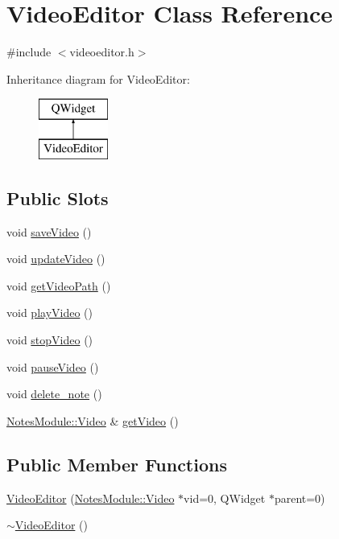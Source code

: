 \hypertarget{class_video_editor}{\section{Video\-Editor Class Reference}
\label{class_video_editor}
}


{\ttfamily \#include $<$videoeditor.\-h$>$}

Inheritance diagram for Video\-Editor\-:\begin{figure}[H]
\begin{center}
\leavevmode
\includegraphics[height=2.000000cm]{class_video_editor}
\end{center}
\end{figure}
\subsection*{Public Slots}
\begin{DoxyCompactItemize}
\item 
void \hyperlink{class_video_editor_a9a109c9d42fc49628809d0e6879860b0}{save\-Video} ()
\item 
void \hyperlink{class_video_editor_a8555ce1e04a385c8d89680695de78e1a}{update\-Video} ()
\item 
void \hyperlink{class_video_editor_ad6c8dfba4def22ea567faeb30cabdec2}{get\-Video\-Path} ()
\item 
void \hyperlink{class_video_editor_af0a827387ec00737cf38c54d8acd8694}{play\-Video} ()
\item 
void \hyperlink{class_video_editor_ac5bbe6c779bc211b4d014878811dba9c}{stop\-Video} ()
\item 
void \hyperlink{class_video_editor_ae612849c0a515b55564f818033cbd5d0}{pause\-Video} ()
\item 
void \hyperlink{class_video_editor_a0401d7f08a50c6c3abbd869afb7f9c5c}{delete\-\_\-note} ()
\item 
\hyperlink{class_notes_module_1_1_video}{Notes\-Module\-::\-Video} \& \hyperlink{class_video_editor_ac4131af5cd3a5aa7696a5916d6eec89f}{get\-Video} ()
\end{DoxyCompactItemize}
\subsection*{Public Member Functions}
\begin{DoxyCompactItemize}
\item 
\hyperlink{class_video_editor_afaba2151dd7813a5081a65afbf326f91}{Video\-Editor} (\hyperlink{class_notes_module_1_1_video}{Notes\-Module\-::\-Video} $\ast$vid=0, Q\-Widget $\ast$parent=0)
\item 
\hyperlink{class_video_editor_aeee69739d4313ec2b2279882ef97c7eb}{$\sim$\-Video\-Editor} ()
\end{DoxyCompactItemize}


